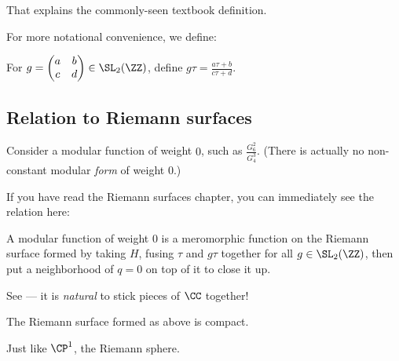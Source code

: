 That explains the commonly-seen textbook definition.

For more notational convenience, we define:
\begin{definition}
	For $g = \begin{pmatrix} a&b \\ c&d \end{pmatrix} \in \SL_2(\ZZ)$,
	define $g \tau = \frac{a \tau+b}{c \tau+d}$.
\end{definition}

\subsection{Relation to Riemann surfaces}

Consider a modular function of weight $0$, such as $\frac{G_6^2}{G_4^3}$.
(There is actually no non-constant modular \emph{form} of weight $0$.)

If you have read the Riemann surfaces chapter, you can immediately see the relation here:
\begin{moral}
	A modular function of weight $0$ is a meromorphic function on the Riemann surface formed by
	taking $H$, fusing $\tau$ and $g \tau$ together for all $g \in \SL_2(\ZZ)$,
	then put a neighborhood of $q=0$ on top of it to close it up.
\end{moral}

See --- it is \emph{natural} to stick pieces of $\CC$ together!

\begin{theorem}
	The Riemann surface formed as above is compact.
\end{theorem}

Just like $\CP^1$, the Riemann sphere.

